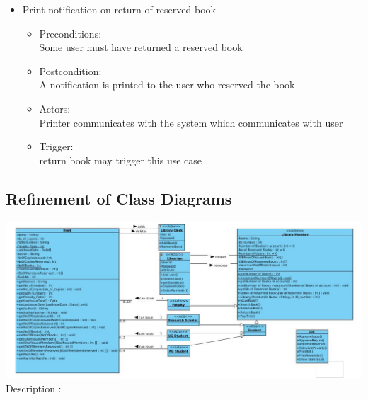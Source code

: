 \documentclass[a4paper]{article}
\begin{document}
\begin{enumerate}
\begin{itemize}
\item Print notification on return of reserved book\\ 
\begin{itemize}
\item Preconditions:\\ Some user must have returned a reserved book \\ 
 \item Postcondition:\\ A notification is printed to the user who reserved the book\\ 
 \item Actors: \\ Printer communicates with the system which communicates with user\\ 
 \item Trigger:\\ return book may trigger this use case\\ 
\end{itemize}

\end{itemize}
\end{enumerate}

\subsection{Refinement of Class Diagrams}
\includegraphics[scale=0.35]{images/classDiagFinal.jpg}
\\
Description : \\
\end{document}
